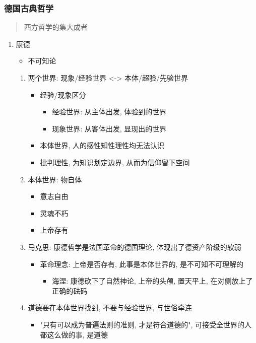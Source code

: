 \documentclass[11pt]{article}
\begin{document}
\subsubsection{德国古典哲学}
\label{sec:org92b1183}
\begin{quote}
西方哲学的集大成者
\end{quote}
\begin{enumerate}
\item 康德
\label{sec:org664b8f6}
\begin{itemize}
\item 不可知论
\end{itemize}
\begin{enumerate}
\item 两个世界: 现象/经验世界 <-> 本体/超验/先验世界
\label{sec:orgf2d3685}
\begin{itemize}
\item 经验/现象区分
\begin{itemize}
\item 经验世界: 从主体出发, 体验到的世界
\item 现象世界: 从客体出发, 显现出的世界
\end{itemize}
\item 本体世界, 人的感性知性理性均无法认识
\item 批判理性, 为知识划定边界, 从而为信仰留下空间
\end{itemize}
\item 本体世界: 物自体
\label{sec:org7f57d85}
\begin{itemize}
\item 意志自由
\item 灵魂不朽
\item 上帝存有
\end{itemize}
\item 马克思: 康德哲学是法国革命的德国理论, 体现出了德资产阶级的软弱
\label{sec:org6338dae}
\begin{itemize}
\item 革命理念: 上帝是否存有, 此事是本体世界的, 是不可知不可理解的
\begin{itemize}
\item 海涅: 康德砍下了自然神论, 上帝的头颅, 置天平上, 在对侧放上了正确的砝码
\end{itemize}
\end{itemize}
\item 道德要在本体世界找到, 不要与经验世界, 与世俗牵连
\label{sec:org9064b97}
\begin{itemize}
\item "只有可以成为普遍法则的准则, 才是符合道德的", 可接受全世界的人都这么做的事, 是道德

\end{itemize}
\end{enumerate}
\end{enumerate}
\end{document}
